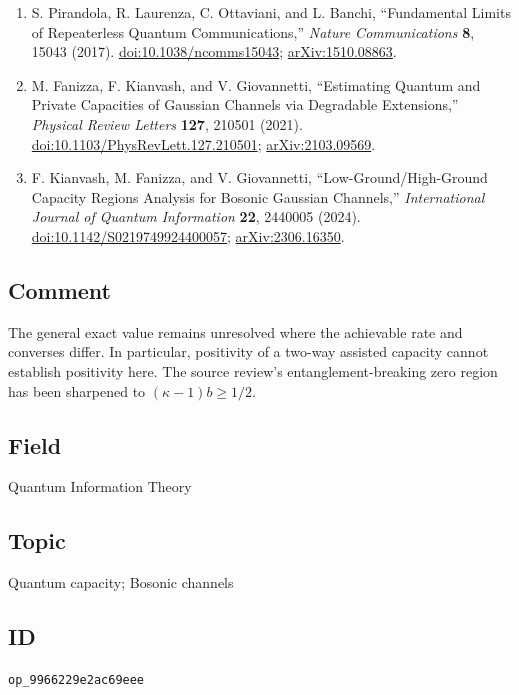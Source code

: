 \begin{enumerate}[label={},leftmargin=4.8em,labelsep=0.5em]
  \footnotesize
  \item[\textup{[PLOB17]}]\label{ref:sc-plob}
  S. Pirandola, R. Laurenza, C. Ottaviani, and L. Banchi, ``Fundamental Limits of Repeaterless Quantum Communications,'' \emph{Nature Communications} \textbf{8}, 15043 (2017). \href{https://doi.org/10.1038/ncomms15043}{doi:10.1038/ncomms15043}; \href{https://arxiv.org/abs/1510.08863}{arXiv:1510.08863}.

  \item[\textup{[FKG21]}]\label{ref:sc-fkg}
  M. Fanizza, F. Kianvash, and V. Giovannetti, ``Estimating Quantum and Private Capacities of Gaussian Channels via Degradable Extensions,'' \emph{Physical Review Letters} \textbf{127}, 210501 (2021). \href{https://doi.org/10.1103/PhysRevLett.127.210501}{doi:10.1103/PhysRevLett.127.210501}; \href{https://arxiv.org/abs/2103.09569}{arXiv:2103.09569}.

  \item[\textup{[KFG24]}]\label{ref:sc-kfg}
  F. Kianvash, M. Fanizza, and V. Giovannetti, ``Low-Ground/High-Ground Capacity Regions Analysis for Bosonic Gaussian Channels,'' \emph{International Journal of Quantum Information} \textbf{22}, 2440005 (2024). \href{https://doi.org/10.1142/S0219749924400057}{doi:10.1142/S0219749924400057}; \href{https://arxiv.org/abs/2306.16350}{arXiv:2306.16350}.
\end{enumerate}

\subsection*{Comment}

The general exact value remains unresolved where the achievable rate and converses differ. In particular, positivity of a two-way assisted capacity cannot establish positivity here. The source review's entanglement-breaking zero region has been sharpened to $(\kappa-1)b\geq1/2$.

\subsection*{Field}

Quantum Information Theory

\subsection*{Topic}

Quantum capacity; Bosonic channels

\subsection*{ID}

\texttt{op\_9966229e2ac69eee}
